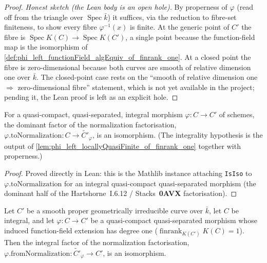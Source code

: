 \begin{proof}
  \emph{Honest sketch (the Lean body is an open hole).} By properness of
  \(\varphi\) (read off from the triangle over \(\operatorname{Spec} \bar k\))
  it suffices, via the reduction to fibre-set finiteness, to show every fibre
  \(\varphi^{-1}(x)\) is finite. At the generic point of \(C'\) the fibre is
  \(\operatorname{Spec} K(C) \to \operatorname{Spec} K(C')\), a single point
  because the function-field map is the isomorphism of
  \cref{def:phi_left_functionField_algEquiv_of_finrank_one}. At a closed point
  the fibre is zero-dimensional because both curves are smooth of relative
  dimension one over \(\bar k\). The closed-point case rests on the
  ``smooth of relative dimension one \(\Rightarrow\) zero-dimensional fibre''
  statement, which is not yet available in the project; pending it, the Lean
  proof is left as an explicit hole.
\end{proof}
\begin{lemma}
  \label{lem:phi_left_toNormalization_isIso_of_isIntegralHom}
  For a quasi-compact, quasi-separated, integral morphism
  \(\varphi \colon C \to C'\) of schemes, the dominant factor of the
  normalization factorisation,
  \(\varphi.\mathrm{toNormalization} \colon C \to \widetilde{C'}_\varphi\), is an
  isomorphism. (The integrality hypothesis is the output of
  \cref{lem:phi_left_locallyQuasiFinite_of_finrank_one} together with
  properness.)
\end{lemma}
\begin{proof}
  \leanok
  Proved directly in Lean: this is the Mathlib instance attaching
  \texttt{IsIso} to \(\varphi.\mathrm{toNormalization}\) for an integral
  quasi-compact quasi-separated morphism (the dominant half of the
  Hartshorne~I.6.12 / Stacks~\textbf{0AVX} factorisation).
\end{proof}
\begin{lemma}
  \label{lem:phi_left_fromNormalization_isIso_of_smoothProper_finrank_one}
  Let \(C'\) be a smooth proper geometrically irreducible curve over \(\bar k\),
  let \(C\) be integral, and let \(\varphi \colon C \to C'\) be a quasi-compact
  quasi-separated morphism whose induced function-field extension has degree one
  (\(\operatorname{finrank}_{K(C')} K(C) = 1\)). Then the integral factor of the
  normalization factorisation,
  \(\varphi.\mathrm{fromNormalization} \colon \widetilde{C'}_\varphi \to C'\), is
  an isomorphism.
\end{lemma}
